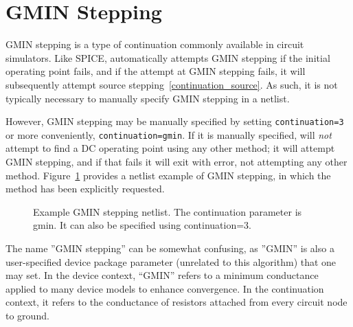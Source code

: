 \newpage 
\section{GMIN Stepping}
\label{continuation_gmin}

GMIN stepping is a type of continuation commonly available in circuit simulators.
Like SPICE, \Xyce{} automatically attempts GMIN stepping if the initial
operating point fails, and if the attempt at GMIN stepping fails, it will subsequently attempt source stepping~\ref{continuation_source}.  As such, it is not typically necessary to manually 
specify GMIN stepping in a \Xyce{} netlist.

However, GMIN stepping may be manually specified by setting
\texttt{continuation=3} or more conveniently, \texttt{continuation=gmin}. If it 
is manually specified, \Xyce{} will \emph{not} attempt to find a DC operating 
point using any other method; it will attempt GMIN stepping, and if that fails 
it will exit with error, not attempting any other method.  Figure~\ref{Gmin_netlist} 
provides a netlist example of GMIN stepping, in which the method has been
explicitly requested.

\begin{figure}[htbp]
\begin{centering}
\caption [Example GMIN stepping netlist.]{Example GMIN stepping netlist. The continuation parameter is gmin. 
It can also be specified using continuation=3. \label  {Gmin_netlist}}
\end{centering}
\end{figure}

The name ''GMIN stepping'' can be somewhat confusing, as ''GMIN'' is
also a user-specified device package parameter (unrelated to this
algorithm) that one may set.  In the device context, ``GMIN'' refers to
a minimum conductance applied to many device models to enhance
convergence.  In the continuation context, it refers to the conductance of
resistors attached from every circuit node to ground.

